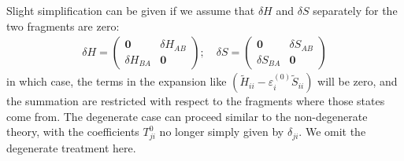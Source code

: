 \documentclass{article}
\newcommand{\order}[2]{#1^{(#2)}}
\begin{document}
Slight simplification can be given if we assume that $\delta H$ and $\delta S$ separately for the two fragments are zero:
\begin{align}
    \delta H = \left( \begin{matrix} \mathbf{0} & \delta H_{AB} \\ \delta H_{BA}  & \mathbf{0} \end{matrix} \right); \quad
    \delta S = \left( \begin{matrix} \mathbf{0} & \delta S_{AB} \\ \delta S_{BA}  & \mathbf{0} \end{matrix} \right)
\end{align}
in which case, the terms in the expansion like $(\tilde{H}_{ii} - \order{\varepsilon_i}{0} \tilde{S}_{ii})$ will be zero, and the summation 
are restricted with respect to the fragments where those states come from. 
The degenerate case can proceed similar to the non-degenerate theory, with the coefficients $T_{ji}^0$ no longer simply given by $\delta_{ji}$. 
We omit the degenerate treatment here.
\end{document}
